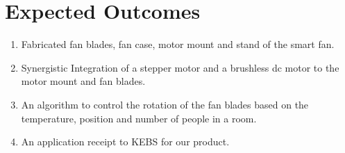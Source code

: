 \section{Expected Outcomes}

\begin{enumerate}
\item Fabricated fan blades, fan case, motor mount and stand of the smart fan.
\item Synergistic Integration of a stepper motor and a brushless dc motor to the motor mount and fan blades.
\item An algorithm to control the rotation of the fan blades based on the temperature, position and number of people in a room.
\item An application receipt to \ac{KEBS} for our product.

\end{enumerate}


